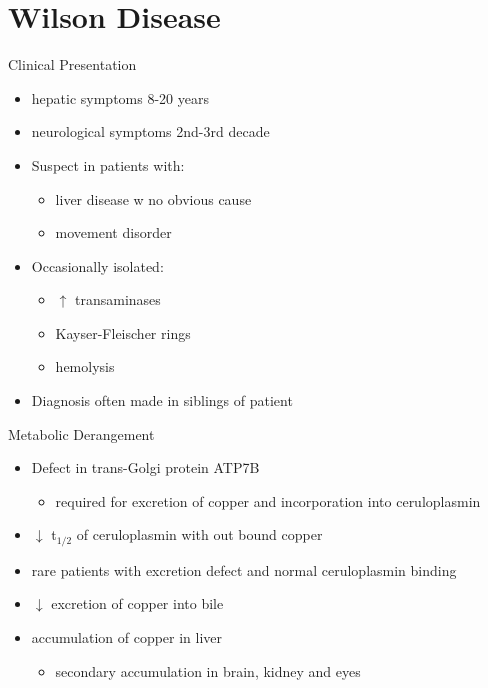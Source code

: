 \documentclass[presentation, smaller]{beamer}
\begin{document}
\section{Wilson Disease}
\label{sec:org82955cf}
\begin{frame}[label={sec:orgfc2d2ad}]{Clinical Presentation}
\begin{itemize}
\item hepatic symptoms 8-20 years
\item neurological symptoms 2nd-3rd decade
\item Suspect in patients with:
\begin{itemize}
\item liver disease w no obvious cause
\item movement disorder
\end{itemize}
\item Occasionally isolated:
\begin{itemize}
\item \(\uparrow\) transaminases
\item Kayser-Fleischer rings
\item hemolysis
\end{itemize}
\item Diagnosis often made in siblings of patient
\end{itemize}
\end{frame}

\begin{frame}[label={sec:org260f9d2}]{Metabolic Derangement}
\begin{itemize}
\item Defect in trans-Golgi protein ATP7B
\begin{itemize}
\item required for excretion of copper and incorporation into ceruloplasmin
\end{itemize}
\item \(\downarrow\) t\(_{\text{1/2}}\) of ceruloplasmin with out bound copper
\item rare patients with excretion defect and normal ceruloplasmin binding
\item \(\downarrow\) excretion of copper into bile
\item accumulation of copper in liver
\begin{itemize}
\item secondary accumulation in brain, kidney and eyes
\end{itemize}
\end{itemize}
\end{frame}
\end{document}
